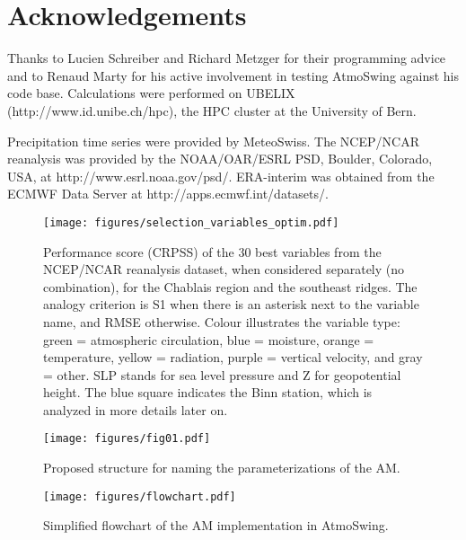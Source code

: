 \documentclass[review]{elsarticle}
\begin{document}
\section*{Acknowledgements}
Thanks to Lucien Schreiber and Richard Metzger for their programming advice and to Renaud Marty for his active involvement in testing AtmoSwing against his code base. Calculations were performed on UBELIX (http://www.id.unibe.ch/hpc), the HPC cluster at the University of Bern. 

Precipitation time series were provided by MeteoSwiss. The NCEP/NCAR reanalysis was provided by the NOAA/OAR/ESRL PSD, Boulder, Colorado, USA, at http://www.esrl.noaa.gov/psd/. ERA-interim was obtained from the ECMWF Data Server at http://apps.ecmwf.int/datasets/. 





\clearpage


\begin{figure*}[t]
	\texttt{[image: figures/selection\_variables\_optim.pdf]}
	\caption{Performance score (CRPSS) of the 30 best variables from the NCEP/NCAR reanalysis dataset, when considered separately (no combination), for the Chablais region and the southeast ridges. The analogy criterion is S1 when there is an asterisk next to the variable name, and RMSE otherwise. Colour illustrates the variable type: green = atmospheric circulation, blue = moisture, orange = temperature, yellow = radiation, purple = vertical velocity, and gray = other. SLP stands for sea level pressure and Z for geopotential height. The blue square indicates the Binn station, which is analyzed in more details later on.} 
	\label{figure:variable_exploration}
\end{figure*}

\begin{figure}[t]
	\texttt{[image: figures/fig01.pdf]}
	\caption{Proposed structure for naming the parameterizations of the AM.}
	\label{figure:nomenclature}
\end{figure}

\begin{figure}[t]
	\texttt{[image: figures/flowchart.pdf]}
	\caption{Simplified flowchart of the AM implementation in AtmoSwing.}
	\label{figure:flowchart_modules_atmoswing}
\end{figure}
\end{document}
